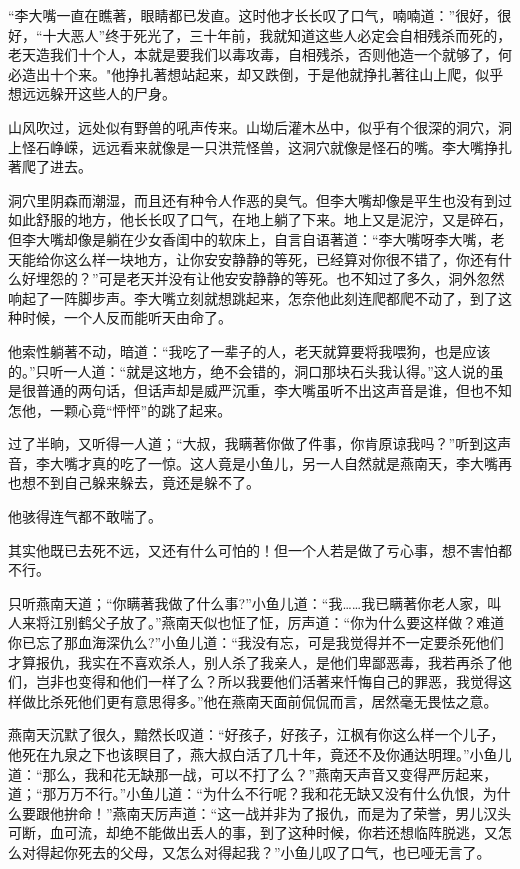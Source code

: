 \documentclass[12pt,oneside]{book}
\begin{document}
``李大嘴一直在瞧著，眼睛都已发直。这时他才长长叹了口气，喃喃道：''很好，很好，``十大恶人''终于死光了，三十年前，我就知道这些人必定会自相残杀而死的，老天造我们十个人，本就是要我们以毒攻毒，自相残杀，否则他造一个就够了，何必造出十个来。"他挣扎著想站起来，却又跌倒，于是他就挣扎著往山上爬，似乎想远远躲开这些人的尸身。

山风吹过，远处似有野兽的吼声传来。山坳后灌木丛中，似乎有个很深的洞穴，洞上怪石峥嵘，远远看来就像是一只洪荒怪兽，这洞穴就像是怪石的嘴。李大嘴挣扎著爬了进去。

洞穴里阴森而潮湿，而且还有种令人作恶的臭气。但李大嘴却像是平生也没有到过如此舒服的地方，他长长叹了口气，在地上躺了下来。地上又是泥泞，又是碎石，但李大嘴却像是躺在少女香闺中的软床上，自言自语著道：``李大嘴呀李大嘴，老天能给你这么样一块地方，让你安安静静的等死，已经算对你很不错了，你还有什么好埋怨的？''可是老天并没有让他安安静静的等死。也不知过了多久，洞外忽然响起了一阵脚步声。李大嘴立刻就想跳起来，怎奈他此刻连爬都爬不动了，到了这种时候，一个人反而能听天由命了。

他索性躺著不动，暗道：``我吃了一辈子的人，老天就算要将我喂狗，也是应该的。''只听一人道：``就是这地方，绝不会错的，洞口那块石头我认得。''这人说的虽是很普通的两句话，但话声却是威严沉重，李大嘴虽听不出这声音是谁，但也不知怎他，一颗心竟``怦怦''的跳了起来。

过了半晌，又听得一人道；``大叔，我瞒著你做了件事，你肯原谅我吗？''听到这声音，李大嘴才真的吃了一惊。这人竟是小鱼儿，另一人自然就是燕南天，李大嘴再也想不到自己躲来躲去，竟还是躲不了。

他骇得连气都不敢喘了。

其实他既已去死不远，又还有什么可怕的！但一个人若是做了亏心事，想不害怕都不行。

只听燕南天道；``你瞒著我做了什么事?''小鱼儿道：``我\ldots\ldots 我已瞒著你老人家，叫人来将江别鹤父子放了。''燕南天似也怔了怔，厉声道：``你为什么要这样做？难道你已忘了那血海深仇么?''小鱼儿道：``我没有忘，可是我觉得并不一定要杀死他们才算报仇，我实在不喜欢杀人，别人杀了我亲人，是他们卑鄙恶毒，我若再杀了他们，岂非也变得和他们一样了么？所以我要他们活著来忏悔自己的罪恶，我觉得这样做比杀死他们更有意思得多。''他在燕南天面前侃侃而言，居然毫无畏怯之意。

燕南天沉默了很久，黯然长叹道：``好孩子，好孩子，江枫有你这么样一个儿子，他死在九泉之下也该瞑目了，燕大叔白活了几十年，竟还不及你通达明理。''小鱼儿道：``那么，我和花无缺那一战，可以不打了么？''燕南天声音又变得严厉起来，道；``那万万不行。''小鱼儿道：``为什么不行呢？我和花无缺又没有什么仇恨，为什么要跟他拚命！''燕南天厉声道：``这一战并非为了报仇，而是为了荣誉，男儿汉头可断，血可流，却绝不能做出丢人的事，到了这种时候，你若还想临阵脱逃，又怎么对得起你死去的父母，又怎么对得起我？''小鱼儿叹了口气，也已哑无言了。
\end{document}
